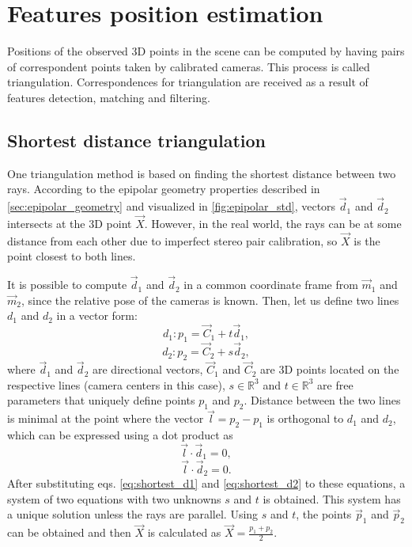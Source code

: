 \section{Features position estimation}
Positions of the observed 3D points in the scene can be computed by having pairs of correspondent points taken by calibrated cameras.
This process is called triangulation.
Correspondences for triangulation are received as a result of features detection, matching and filtering.

\subsection{Shortest distance triangulation}
\label{sec:shortest_distance}
One triangulation method is based on finding the shortest distance between two rays.
According to the epipolar geometry properties described in \autoref{sec:epipolar_geometry} and visualized in \autoref{fig:epipolar_std}, vectors $\vec{d}_1$ and $\vec{d}_2$ intersects at the 3D point $\vec{X}$.
However, in the real world, the rays can be at some distance from each other due to imperfect stereo pair calibration, so $\vec{X}$ is the point closest to both lines.

It is possible to compute $\vec{d}_1$ and $\vec{d}_2$ in a common coordinate frame from $\vec{m}_1$ and $\vec{m}_2$, since the relative pose of the cameras is known.
Then, let us define two lines $d_1$ and $d_2$ in a vector form:
\begin{equation}
    \label{eq:shortest_d1}
    d_1: p_1 = \vec{C}_1 + t \vec{d}_1,
\end{equation}
\begin{equation}
    \label{eq:shortest_d2}
    d_2: p_2 = \vec{C}_2 + s \vec{d}_2,
\end{equation}
where $\vec{d}_1$ and $\vec{d}_2$ are directional vectors, $\vec{C}_1$ and $\vec{C}_2$ are 3D points located on the respective lines (camera centers in this case), $s \in \mathbb{R}^{3}$ and $t \in \mathbb{R}^3$ are free parameters that uniquely define points $p_1$ and $p_2$. 
Distance between the two lines is minimal at the point where the vector $\vec{l} = p_2 - p_1$ is orthogonal to $d_1$ and $d_2$, which can be expressed using a dot product as 
\begin{equation}
    \label{eq:ldd1}
    \vec{l} \cdot \vec{d}_1 = 0,
\end{equation}
\begin{equation}
    \label{eq:ldd2}
    \vec{l} \cdot \vec{d}_2 = 0.
\end{equation}
After substituting eqs. \eqref{eq:shortest_d1} and \eqref{eq:shortest_d2} to these equations, a system of two equations with two unknowns $s$ and $t$ is obtained.
This system has a unique solution unless the rays are parallel.
Using $s$ and $t$, the points $\vec{p}_1$ and $\vec{p}_2$ can be obtained and then $\vec{X}$ is calculated as $\vec{X} = \frac{p_1 + p_2}{2}$.

